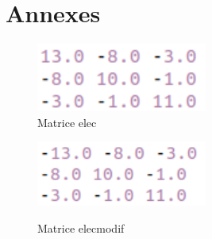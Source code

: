 \documentclass[12,french]{report}
\begin{document}
\chapter*{Annexes}
\begin{figure}[H]
    \begin{minipage}[c]{.46\linewidth}
        \centering
        \includegraphics[width=0.5\textwidth]{./Images/elec}\\
        \caption*{Matrice elec}
    \end{minipage}
    \hfill%
    \begin{minipage}[c]{.46\linewidth}
        \centering
        \includegraphics[width=0.5\textwidth]{./Images/elecmodif}\\
        \caption*{Matrice elecmodif}
    \end{minipage}
\end{figure}%
\end{document}
